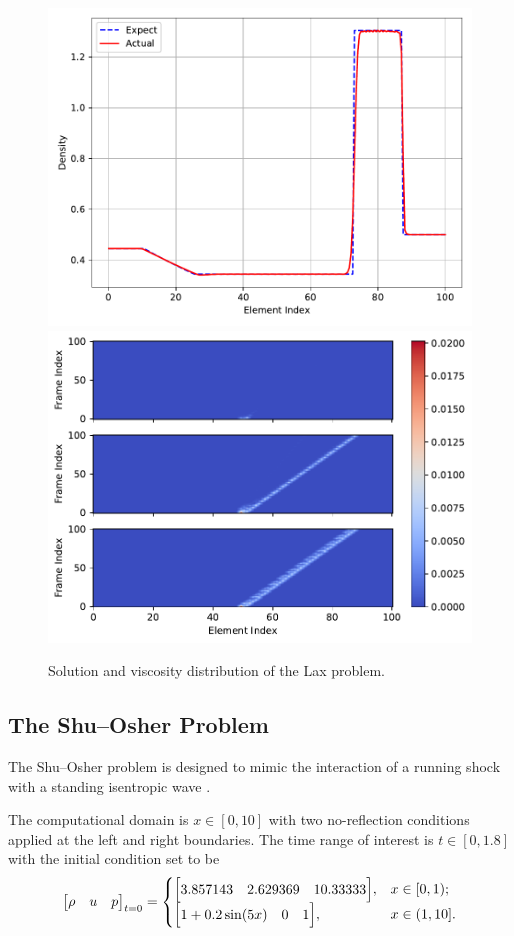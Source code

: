 \documentclass[10pt,draft]{article}
\begin{document}
\begin{figure}[H]
  \centering
  \includegraphics[width=.49\textwidth]{./lax/Frame100.pdf}
  \includegraphics[width=.49\textwidth]{./lax/Viscosity.pdf}
  \caption{Solution and viscosity distribution of the Lax problem.}
  \label{fig:lax}
\end{figure}

\subsection{The Shu--Osher Problem}\label{sec:shu_osher}

The Shu--Osher problem is designed to mimic the interaction of a running shock with a standing isentropic wave \cite{Shu_1989}.

The computational domain is $x\in[0, 10]$ with two no-reflection conditions applied at the left and right boundaries.
The time range of interest is $t\in[0, 1.8]$ with the initial condition set to be
\begin{equation}
\mqty[\rho & u & p]_{t=0}
=
\begin{cases}
\mqty[3.857143 & 2.629369 & 10.33333], &x\in[0,1);\\
\mqty[1+0.2\sin(5x) & 0 & 1], &x\in(1,10].
\end{cases}
\end{equation}
\end{document}
